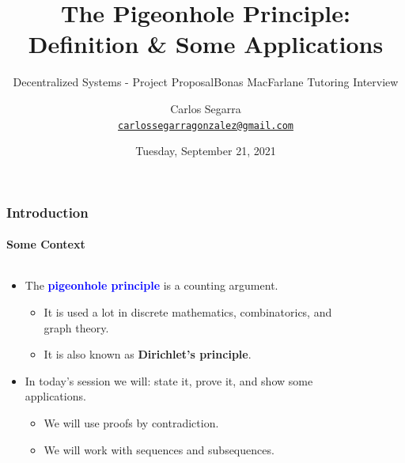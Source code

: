 \documentclass[9pt,    %
    english,            %
    xcolor=table,       %
    envcountsect,        %
    aspectratio=169     %
]{beamer}
\subtitle{Decentralized Systems - Project Proposal} %
\title[The Pigeonhole Principle] %
    {The Pigeonhole Principle: Definition \& Some Applications}
\subtitle{Bonas MacFarlane Tutoring Interview} %
\date[September 21, 2021] %
    {Tuesday, September 21, 2021}
\author[] %
{Carlos Segarra \\ \texttt{\href{mailto:carlossegarragonzalez@gmail.com}{carlossegarragonzalez@gmail.com}}}
\begin{document}
\begin{frame}
  \titlepage
\end{frame}

\begin{frame}
    \frametitle{Introduction}
    \framesubtitle{Some Context}

    \begin{columns}[t]
        \begin{column}{.6\textwidth}
            \begin{itemize}
                \item<1-> The \textbf{\textcolor{blue}{pigeonhole principle}} is a counting argument.
                \begin{itemize}
                    \normalsize
                    \item It is used a lot in discrete mathematics, combinatorics, and graph theory.
                    \item It is also known as \textbf{Dirichlet's principle}.
                \end{itemize}\vspace{15pt}
                \item<2-> In today's session we will: state it, prove it, and show some applications.
                \begin{itemize}
                    \normalsize
                    \item<2-> We will use proofs by contradiction.
                    \item<2-> We will work with sequences and subsequences.
                \end{itemize}
            \end{itemize}
        \end{column}
        \begin{column}{.3\textwidth}
            \vspace{-10pt}
            \begin{figure}
                \centering

\end{figure}
\end{column}
\end{columns}
\end{frame}
\end{document}
